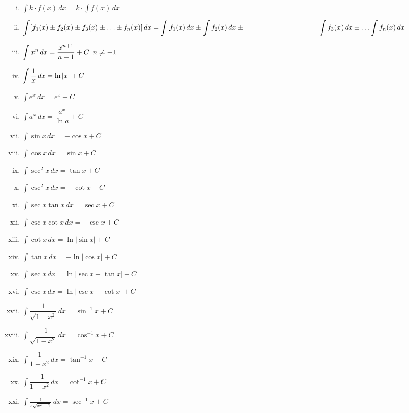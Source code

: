 \documentclass{article}
\begin{document}
\begin{enumerate}[i.]
    \item $\displaystyle\int k\cdot f(x) \, dx = k \cdot \displaystyle\int f(x) \, dx$
    \item $\displaystyle\int [f_{1}(x)\pm f_{2}(x)\pm f_{3}(x)\pm \ldots \pm f_{n}(x)] \, dx= \displaystyle\int f_{1}(x) \, dx\pm \displaystyle\int f_{2}(x) \, dx\pm \hphantom{1cm}\hspace{3cm} \displaystyle\int f_{3}(x) \, dx \pm \ldots \displaystyle\int f_{n}(x) \, dx$
    \item $\displaystyle\int x^n \, dx=\dfrac{x^{n+1}}{n+1} +C \hfill \hspace{2mm} n \not=-1$
    \item $\displaystyle\int \dfrac{1}{x} \, dx=\ln \abs{x} +C$
    \item $\displaystyle\int e^x \, dx=e^x +C$
    \item $\displaystyle\int a^x \, dx=\dfrac{a^x}{\ln a} +C$
    \item $\displaystyle\int \sin x \, dx=-\cos x +C$
    \item $\displaystyle\int \cos x \, dx=\sin x +C$
    \item $\displaystyle\int \sec^2 x \, dx=\tan x +C$
    \item $\displaystyle\int \csc^2 x \, dx=-\cot x +C$
    \item $\displaystyle\int \sec x \tan x \, dx=\sec x +C$
    \item $\displaystyle\int \csc x \cot x \, dx=-\csc x +C $
    \item $\displaystyle\int \cot x \, dx=\ln |\sin x| +C$
    \item $\displaystyle\int \tan x \, dx=-\ln |\cos x| +C$
    \item $\displaystyle\int \sec x \, dx=\ln |\sec x + \tan x| +C$
    \item $\displaystyle\int \csc x \, dx=\ln |\csc x-\cot x| +C$
    \item $\displaystyle\int \dfrac{1}{\displaystyle\sqrt{1-x^2}} \, dx=\sin^{-1} x +C$
    \item $\displaystyle\int \dfrac{-1}{\displaystyle\sqrt{1-x^2}} \, dx=\cos^{-1} x +C$
    \item $\displaystyle\int \dfrac{1}{1+x^2} \, dx= \tan^{-1} x+C$
    \item $\displaystyle\int \dfrac{-1}{1+x^2} \, dx= \cot^{-1}x +C$
    \item $\displaystyle\int \frac{1}{x\displaystyle\sqrt{x^2-1}} \, dx=\sec^{-1}x +C$

\end{enumerate}
\end{document}
